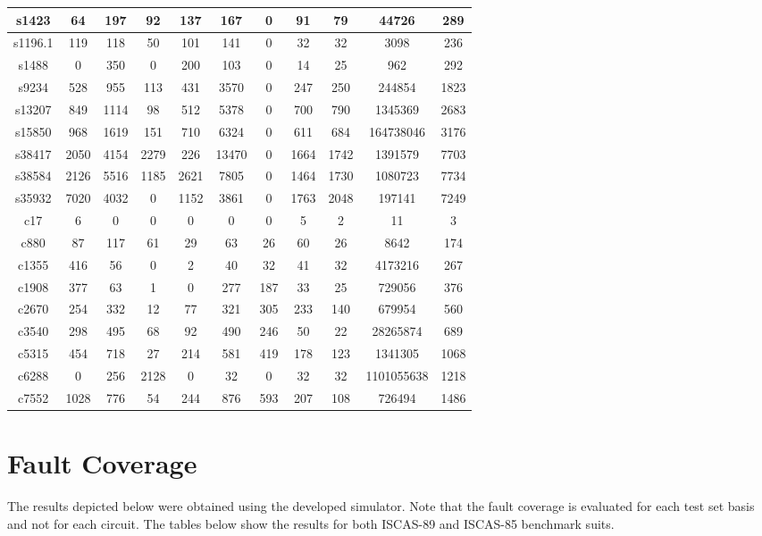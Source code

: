 \documentclass[a4paper,12pt]{article}
\begin{document}
\begin{center}
\begin{tabular}{||c c c c c c c c c c c||}
\hline
s1423 & 64 & 197 & 92 & 137 & 167 & 0 & 91 & 79 & 44726 & 289 \\ 
\hline
s1196.1 & 119 & 118 & 50 & 101 & 141 & 0 & 32 & 32 & 3098 & 236 \\ 
\hline
s1488 & 0 & 350 & 0 & 200 & 103 & 0 & 14 & 25 & 962 & 292 \\ 
\hline
s9234 & 528 & 955 & 113 & 431 & 3570 & 0 & 247 & 250 & 244854 & 1823 \\ 
\hline
s13207 & 849 & 1114 & 98 & 512 & 5378 & 0 & 700 & 790 & 1345369 & 2683 \\ 
\hline
s15850 & 968 & 1619 & 151 & 710 & 6324 & 0 & 611 & 684 & 164738046 & 3176 \\ 
\hline
s38417 & 2050 & 4154 & 2279 & 226 & 13470 & 0 & 1664 & 1742 & 1391579 & 7703 \\ 
\hline
s38584 & 2126 & 5516 & 1185 & 2621 & 7805 & 0 & 1464 & 1730 & 1080723 & 7734 \\ 
\hline
s35932 & 7020 & 4032 & 0 & 1152 & 3861 & 0 & 1763 & 2048 & 197141 & 7249 \\ 
\hline
c17 & 6 & 0 & 0 & 0 & 0 & 0 & 5 & 2 & 11 & 3 \\ 
\hline
c880 & 87 & 117 & 61 & 29 & 63 & 26 & 60 & 26 & 8642 & 174 \\ 
\hline
c1355 & 416 & 56 & 0 & 2 & 40 & 32 & 41 & 32 & 4173216 & 267 \\ 
\hline
c1908 & 377 & 63 & 1 & 0 & 277 & 187 & 33 & 25 & 729056 & 376 \\ 
\hline
c2670 & 254 & 332 & 12 & 77 & 321 & 305 & 233 & 140 & 679954 & 560 \\ 
\hline
c3540 & 298 & 495 & 68 & 92 & 490 & 246 & 50 & 22 & 28265874 & 689 \\ 
\hline
c5315 & 454 & 718 & 27 & 214 & 581 & 419 & 178 & 123 & 1341305 & 1068 \\ 
\hline
c6288 & 0 & 256 & 2128 & 0 & 32 & 0 & 32 & 32 & 1101055638 & 1218 \\ 
\hline
c7552 & 1028 & 776 & 54 & 244 & 876 & 593 & 207 & 108 & 726494 & 1486 \\ 
\hline
\end{tabular}
\end{center}

\clearpage

\section*{Fault Coverage}
The results depicted below were obtained using the developed simulator. Note that the fault coverage is evaluated for each test set basis and not for each circuit. The tables below show the results for both ISCAS-89 and ISCAS-85 benchmark suits.
\end{document}
